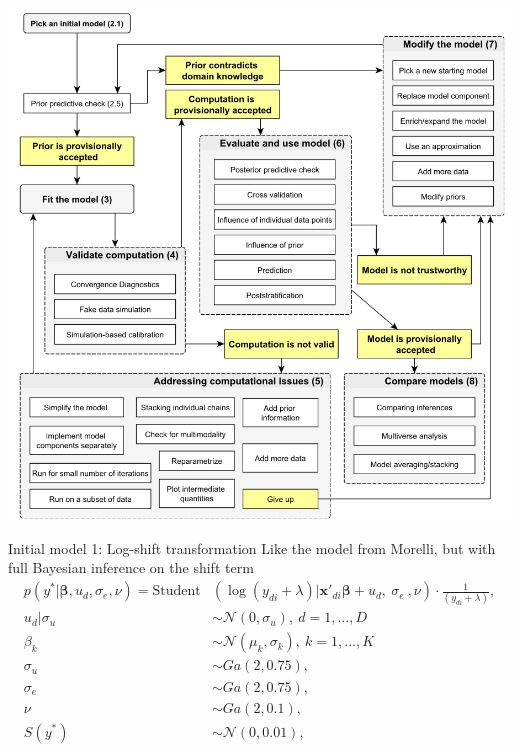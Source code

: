 \begin{frame}
    \vspace{-1cm}
    \centering
    \includegraphics[width=0.75\linewidth]{../graphics/workflow}
\end{frame}

\begin{frame}{Initial model 1: Log-shift transformation}
    Like the model from Morelli, but with full Bayesian inference on the shift term
    \begin{equation}
        \begin{split}
            p(y^*|\boldsymbol \beta, u_d, \sigma_e, \nu)   =        \text{Student}&(\log(y_{di} + \lambda)| \boldsymbol{x'}_{di} \boldsymbol \beta + u_d,\ \sigma_e\ , \nu)\cdot \frac 1 {(y_{di} + \lambda)}, \\
            u_d | \sigma_u & \sim \mathcal N(0, \sigma_u),\ d = 1, ..., D \\
            \beta_k & \sim \mathcal N(\mu_k, \sigma_k),\ k = 1, ..., K\\
            \sigma_u & \sim Ga(2, 0.75), \\
            \sigma_e & \sim Ga(2, 0.75), \\
            \nu & \sim Ga(2, 0.1), \\
            S(y^*) & \sim \mathcal N(0, 0.01),\\
        \end{split}
        \label{eq:trafo_hb}
    \end{equation}
\end{frame}

